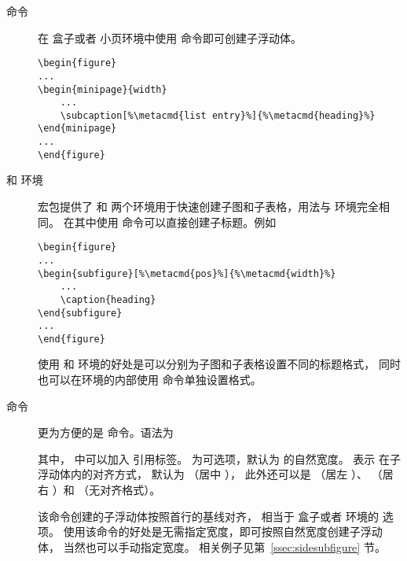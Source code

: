 \begin{description}
	\item[ 命令] 在  盒子或者  小页环境中使用  命令即可创建子浮动体。
\begin{lstlisting}[escapechar=\%]
\begin{figure}
...
\begin{minipage}{width}
	...
	\subcaption[%\metacmd{list entry}%]{%\metacmd{heading}%}
\end{minipage}
...
\end{figure}
\end{lstlisting}
	\item[ 和  环境] 
	 宏包提供了  和  两个环境用于快速创建子图和子表格，用法与  环境完全相同。
	在其中使用  命令可以直接创建子标题。例如
\begin{lstlisting}[escapechar=\%]
\begin{figure}
...
\begin{subfigure}[%\metacmd{pos}%]{%\metacmd{width}%}
	...
	\caption{heading}
\end{subfigure}
...
\end{figure}
\end{lstlisting}
	使用  和  环境的好处是可以分别为子图和子表格设置不同的标题格式，
	同时也可以在环境的内部使用  命令单独设置格式。
	
	\item[ 命令] 
	更为方便的是  命令。语法为
\begin{center}
\end{center}
	其中， 中可以加入  引用标签。
	 为可选项，默认为  的自然宽度。
	表示 在子浮动体内的对齐方式，
	默认为  （居中 ），
	此外还可以是  （居左 ）、
	 （居右 ）和  （无对齐格式）。
	
	该命令创建的子浮动体按照首行的基线对齐，
	相当于  盒子或者  环境的 \opt{[t]} 选项。
	使用该命令的好处是无需指定宽度，即可按照自然宽度创建子浮动体，
	当然也可以手动指定宽度。
	相关例子见第~\ref{ssec:sidesubfigure} 节。
\end{description}



